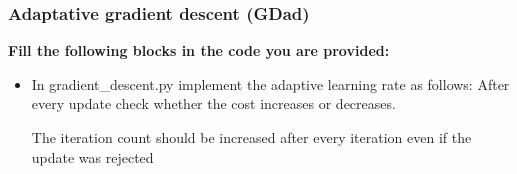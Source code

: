 \documentclass[a4paper]{article}
\begin{document}
\subsubsection{Adaptative gradient descent (GDad)}
\textbf{Fill the following blocks in the code you are provided:}
\begin{itemize}
\item In gradient\_descent.py implement the adaptive learning rate as follows: After every update check whether the cost increases or decreases.
The iteration count should be increased after every iteration even if the update was rejected
\end{itemize}
\end{document}
